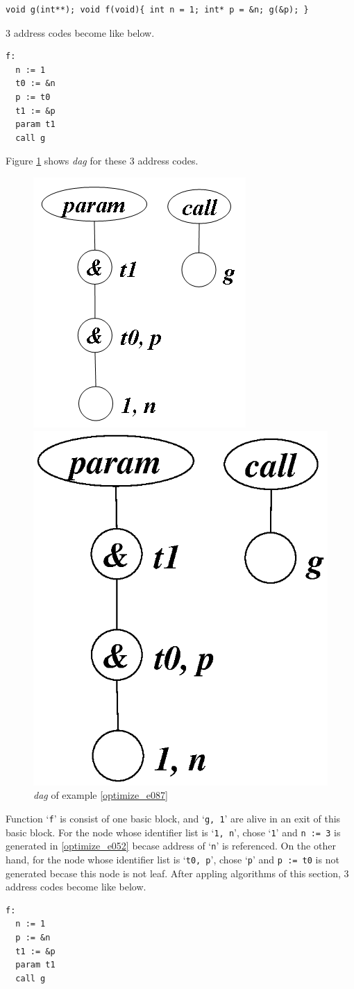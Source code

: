 \begin{Example}
\label{optimize_e087}
\begin{verbatim}
void g(int**); void f(void){ int n = 1; int* p = &n; g(&p); }
\end{verbatim}
3 address codes become like below.
\begin{verbatim}
f:
  n := 1
  t0 := &n
  p := t0
  t1 := &p
  param t1
  call g
\end{verbatim}
Figure \ref{optimize_e088} shows {\em dag} for these 3 address codes.
\begin{figure}[htbp]
\begin{center}
\begin{htmlonly}
\includegraphics[width=0.392\linewidth,height=0.5\linewidth]{opt037.png}
\end{htmlonly}
\begin{latexonly}
\includegraphics[width=0.392\linewidth,height=0.5\linewidth]{opt037.eps}
\end{latexonly}
\caption{{\em dag} of example \ref{optimize_e087}}
\label{optimize_e088}
\end{center}
\end{figure}
Function `{\tt{f}}' is consist of one basic block,
and `{\tt{g, 1}}' are alive in an exit of this basic block.
For the node whose identifier list is `{\tt{1, n}}',
chose `{\tt{1}}' and {\tt{n := 3}} is generated in 
\ref{optimize_e052} becase address of `{\tt{n}}' is referenced.
On the other hand, for
the node whose identifier list is `{\tt{t0, p}}',
chose `{\tt{p}}' and {\tt{p := t0}} is not generated
becase this node is not leaf.
After appling algorithms of this section,
3 address codes become like below.
\begin{verbatim}
f:
  n := 1
  p := &n
  t1 := &p
  param t1
  call g
\end{verbatim}
\end{Example}

